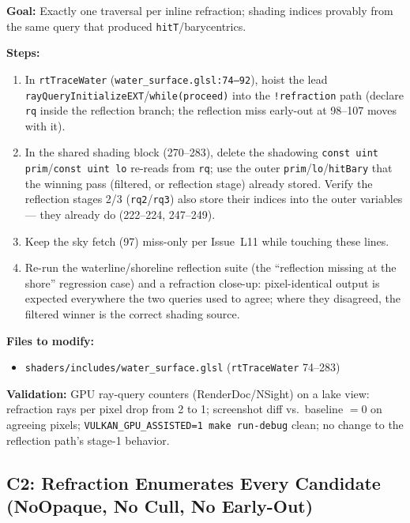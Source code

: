 \documentclass[11pt,a4paper]{article}
\begin{document}
\begin{tcolorbox}[promptbox={Prompt: Remove the Discarded Lead Ray from the Refraction Path}]
\textbf{Goal:} Exactly one traversal per inline refraction; shading indices provably from the same query that produced \texttt{hitT}/barycentrics.

\textbf{Steps:}
\begin{enumerate}
    \item In \texttt{rtTraceWater} (\texttt{water\_surface.glsl:74--92}), hoist the lead \texttt{rayQueryInitializeEXT}/\texttt{while(proceed)} into the \texttt{!refraction} path (declare \texttt{rq} inside the reflection branch; the reflection miss early-out at 98--107 moves with it).
    \item In the shared shading block (270--283), delete the shadowing \texttt{const uint prim}/\texttt{const uint lo} re-reads from \texttt{rq}; use the outer \texttt{prim}/\texttt{lo}/\texttt{hitBary} that the winning pass (filtered, or reflection stage) already stored. Verify the reflection stages 2/3 (\texttt{rq2}/\texttt{rq3}) also store their indices into the outer variables --- they already do (222--224, 247--249).
    \item Keep the sky fetch (97) miss-only per Issue~L11 while touching these lines.
    \item Re-run the waterline/shoreline reflection suite (the ``reflection missing at the shore'' regression case) and a refraction close-up: pixel-identical output is expected everywhere the two queries used to agree; where they disagreed, the filtered winner is the correct shading source.
\end{enumerate}

\textbf{Files to modify:}
\begin{itemize}
    \item \texttt{shaders/includes/water\_surface.glsl} (\texttt{rtTraceWater} 74--283)
\end{itemize}

\textbf{Validation:} GPU ray-query counters (RenderDoc/NSight) on a lake view: refraction rays per pixel drop from 2 to 1; screenshot diff vs.\ baseline $=0$ on agreeing pixels; \texttt{VULKAN\_GPU\_ASSISTED=1 make run-debug} clean; no change to the reflection path's stage-1 behavior.
\end{tcolorbox}

\subsection{C2: Refraction Enumerates Every Candidate (NoOpaque, No Cull, No Early-Out)}
\end{document}
